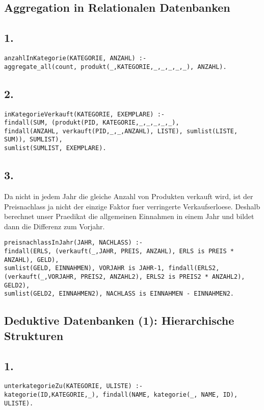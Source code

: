 \documentclass[a4paper, 11pt]{article}
\begin{document}
\subsection{Aggregation in Relationalen Datenbanken}
\subsection*{1.}
\begin{verbatim}
anzahlInKategorie(KATEGORIE, ANZAHL) :-
aggregate_all(count, produkt(_,KATEGORIE,_,_,_,_,_), ANZAHL).
\end{verbatim}
\pagebreak
\subsection*{2.}
\begin{verbatim}
inKategorieVerkauft(KATEGORIE, EXEMPLARE) :-
findall(SUM, (produkt(PID, KATEGORIE,_,_,_,_,_),
findall(ANZAHL, verkauft(PID,_,_,ANZAHL), LISTE), sumlist(LISTE, SUM)), SUMLIST), 
sumlist(SUMLIST, EXEMPLARE).
\end{verbatim}
\subsection*{3.}
Da nicht in jedem Jahr die gleiche Anzahl von Produkten verkauft wird, ist der Preisnachlass ja nicht der einzige Faktor fuer verringerte Verkaufserloese. Deshalb berechnet unser Praedikat die allgemeinen Einnahmen in einem Jahr und bildet dann die Differenz zum Vorjahr.
\begin{verbatim}
preisnachlassInJahr(JAHR, NACHLASS) :-
findall(ERLS, (verkauft(_,JAHR, PREIS, ANZAHL), ERLS is PREIS * ANZAHL), GELD), 
sumlist(GELD, EINNAHMEN), VORJAHR is JAHR-1, findall(ERLS2, 
(verkauft(_,VORJAHR, PREIS2, ANZAHL2), ERLS2 is PREIS2 * ANZAHL2), GELD2),
sumlist(GELD2, EINNAHMEN2), NACHLASS is EINNAHMEN - EINNAHMEN2.
\end{verbatim}
\subsection{Deduktive Datenbanken (1): Hierarchische Strukturen}
\subsection*{1.}
\begin{verbatim}
unterkategorieZu(KATEGORIE, ULISTE) :-
kategorie(ID,KATEGORIE,_), findall(NAME, kategorie(_, NAME, ID), ULISTE).
\end{verbatim}
\end{document}
